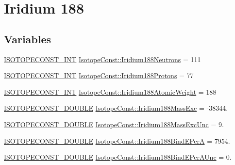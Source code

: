 \hypertarget{group___isotope_const-_iridium-_ir188}{}\section{Iridium 188}
\label{group___isotope_const-_iridium-_ir188}
\subsection*{Variables}
\begin{DoxyCompactItemize}
\item 
\mbox{\hyperlink{group___isotope_const-_macros_ga5f18360b3e99483a35c32d789e62621c}{I\+S\+O\+T\+O\+P\+E\+C\+O\+N\+S\+T\+\_\+\+I\+NT}} \mbox{\hyperlink{group___isotope_const-_iridium-_ir188_ga0fd2c5bdacdd5f46c05f24bc8b04afeb}{Isotope\+Const\+::\+Iridium188\+Neutrons}} = 111
\item 
\mbox{\hyperlink{group___isotope_const-_macros_ga5f18360b3e99483a35c32d789e62621c}{I\+S\+O\+T\+O\+P\+E\+C\+O\+N\+S\+T\+\_\+\+I\+NT}} \mbox{\hyperlink{group___isotope_const-_iridium-_ir188_ga8cd81901192d1e171ad4d29b91e8f3f7}{Isotope\+Const\+::\+Iridium188\+Protons}} = 77
\item 
\mbox{\hyperlink{group___isotope_const-_macros_ga5f18360b3e99483a35c32d789e62621c}{I\+S\+O\+T\+O\+P\+E\+C\+O\+N\+S\+T\+\_\+\+I\+NT}} \mbox{\hyperlink{group___isotope_const-_iridium-_ir188_ga0ebd0cb43382ccb1c8245e1fdaa62bdb}{Isotope\+Const\+::\+Iridium188\+Atomic\+Weight}} = 188
\item 
\mbox{\hyperlink{group___isotope_const-_macros_ga8f45a7272ce02c0b4c65c44636ed719a}{I\+S\+O\+T\+O\+P\+E\+C\+O\+N\+S\+T\+\_\+\+D\+O\+U\+B\+LE}} \mbox{\hyperlink{group___isotope_const-_iridium-_ir188_ga952a65ecd2ac9dfe54a74e9f66a39dd4}{Isotope\+Const\+::\+Iridium188\+Mass\+Exc}} = -\/38344.
\item 
\mbox{\hyperlink{group___isotope_const-_macros_ga8f45a7272ce02c0b4c65c44636ed719a}{I\+S\+O\+T\+O\+P\+E\+C\+O\+N\+S\+T\+\_\+\+D\+O\+U\+B\+LE}} \mbox{\hyperlink{group___isotope_const-_iridium-_ir188_gac77463d929e86779a60e4a16f7e1b4bc}{Isotope\+Const\+::\+Iridium188\+Mass\+Exc\+Unc}} = 9.
\item 
\mbox{\hyperlink{group___isotope_const-_macros_ga8f45a7272ce02c0b4c65c44636ed719a}{I\+S\+O\+T\+O\+P\+E\+C\+O\+N\+S\+T\+\_\+\+D\+O\+U\+B\+LE}} \mbox{\hyperlink{group___isotope_const-_iridium-_ir188_ga3161c51ece1c4c07c3c2fae773434cae}{Isotope\+Const\+::\+Iridium188\+Bind\+E\+PerA}} = 7954.
\item 
\mbox{\hyperlink{group___isotope_const-_macros_ga8f45a7272ce02c0b4c65c44636ed719a}{I\+S\+O\+T\+O\+P\+E\+C\+O\+N\+S\+T\+\_\+\+D\+O\+U\+B\+LE}} \mbox{\hyperlink{group___isotope_const-_iridium-_ir188_ga4b97768a1ce28c4c35a03909eb9554b0}{Isotope\+Const\+::\+Iridium188\+Bind\+E\+Per\+A\+Unc}} = 0.

\end{DoxyCompactItemize}

